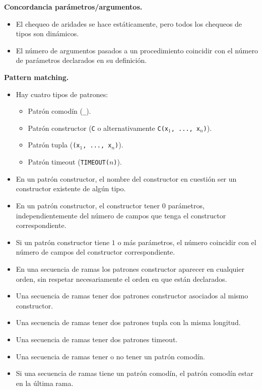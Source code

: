 \documentclass{article}
\begin{document}
{\bf Concordancia par\'ametros/argumentos.}
\begin{itemize}
\item El chequeo de aridades se hace est\'aticamente, pero todos los chequeos de tipos son din\'amicos.
\item El n\'umero de argumentos pasados a un procedimiento \DEBE coincidir con el n\'umero de par\'ametros declarados en su definici\'on.
\end{itemize}

{\bf Pattern matching.}
\begin{itemize}
\item Hay cuatro tipos de patrones:
  \begin{itemize}
  \item Patr\'on comod\'in (\texttt{\_}).
  \item Patr\'on constructor (\texttt{C} o alternativamente \texttt{C(x$_1$, ..., x$_n$)}).
  \item Patr\'on tupla (\texttt{(x$_1$, ..., x$_n$)}).
  \item Patr\'on timeout (\texttt{TIMEOUT($n$)}).
  \end{itemize}
\item En un patr\'on constructor, el nombre del constructor en cuesti\'on \DEBE ser un constructor existente de
      alg\'un tipo.
\item En un patr\'on constructor, el constructor \PUEDE tener $0$ par\'ametros, independientemente del n\'umero
      de campos que tenga el constructor correspondiente.
\item Si un patr\'on constructor tiene $1$ o m\'as par\'ametros, el n\'umero \DEBE coincidir con el n\'umero
      de campos del constructor correspondiente.
\item En una secuencia de ramas los patrones constructor \PUEDEN aparecer en cualquier orden, sin respetar necesariamente el orden en que est\'an declarados.
\item Una secuencia de ramas \NOPUEDE tener dos patrones constructor asociados al mismo constructor.
\item Una secuencia de ramas \NOPUEDE tener dos patrones tupla con la misma longitud.
\item Una secuencia de ramas \NOPUEDE tener dos patrones timeout.
\item Una secuencia de ramas \PUEDE tener o no tener un patr\'on comod\'in.
\item Si una secuencia de ramas tiene un patr\'on comod\'in, el patr\'on comod\'in \DEBE estar en la \'ultima rama.

\end{itemize}
\end{document}
